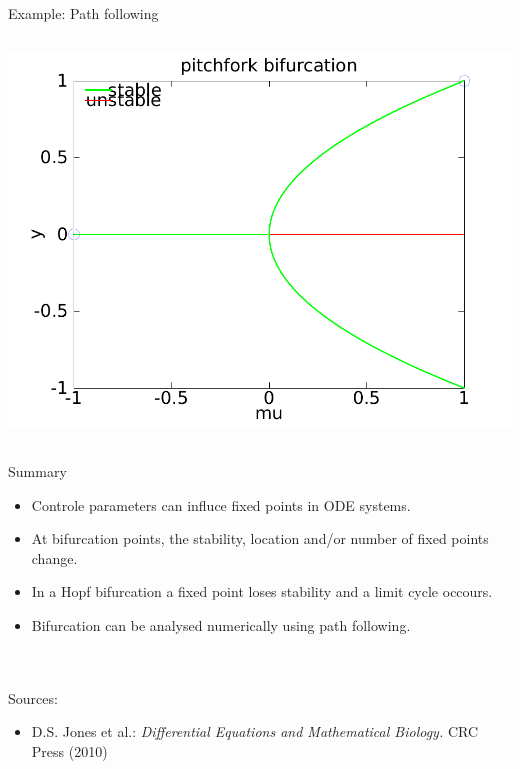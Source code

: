 \documentclass{beamer}
\begin{document}
\begin{frame}{Example: Path following}
\begin{columns}
        \pause
        
        \includegraphics[width=1\textwidth]{grafik/pfexample2}
        
    \end{columns}
\end{frame}

\begin{frame}{Summary}
    \begin{itemize}
        \item Controle parameters can influce fixed points in ODE systems.
        \item At bifurcation points, the stability, location and/or number of fixed points change. 
        \item In a Hopf bifurcation a fixed point loses stability and a limit cycle occours.
        \item Bifurcation can be analysed numerically using path following.
    \end{itemize}

~\\
~\\
    \small
    Sources:
    \begin{itemize}
        \small \item D.S. Jones et al.: \emph{Differential Equations and Mathematical Biology.} CRC Press (2010)
    \end{itemize}

\end{frame}
\end{document}
